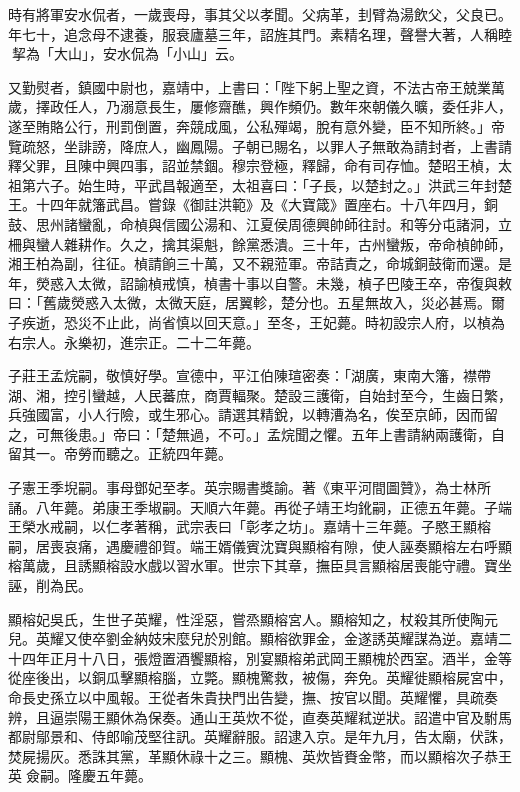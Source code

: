 時有將軍安水侃者，一歲喪母，事其父以孝聞。父病革，刲臂為湯飲父，父良已。年七十，追念母不逮養，服衰廬墓三年，詔旌其門。素精名理，聲譽大著，人稱睦挈為「大山」，安水侃為「小山」云。

又勤熨者，鎮國中尉也，嘉靖中，上書曰：「陛下躬上聖之資，不法古帝王兢業萬歲，擇政任人，乃溺意長生，屢修齋醮，興作頻仍。數年來朝儀久曠，委任非人，遂至賄賂公行，刑罰倒置，奔競成風，公私殫竭，脫有意外變，臣不知所終。」帝覽疏怒，坐誹謗，降庶人，幽鳳陽。子朝已賜名，以罪人子無敢為請封者，上書請釋父罪，且陳中興四事，詔並禁錮。穆宗登極，釋歸，命有司存恤。楚昭王楨，太祖第六子。始生時，平武昌報適至，太祖喜曰：「子長，以楚封之。」洪武三年封楚王。十四年就籓武昌。嘗錄《御註洪範》及《大寶箴》置座右。十八年四月，銅鼓、思州諸蠻亂，命楨與信國公湯和、江夏侯周德興帥師往討。和等分屯諸洞，立柵與蠻人雜耕作。久之，擒其渠魁，餘黨悉潰。三十年，古州蠻叛，帝命楨帥師，湘王柏為副，往征。楨請餉三十萬，又不親蒞軍。帝詰責之，命城銅鼓衛而還。是年，熒惑入太微，詔諭楨戒慎，楨書十事以自警。未幾，楨子巴陵王卒，帝復與敕曰：「舊歲熒惑入太微，太微天庭，居翼軫，楚分也。五星無故入，災必甚焉。爾子疾逝，恐災不止此，尚省慎以回天意。」至冬，王妃薨。時初設宗人府，以楨為右宗人。永樂初，進宗正。二十二年薨。

子莊王孟烷嗣，敬慎好學。宣德中，平江伯陳瑄密奏：「湖廣，東南大籓，襟帶湖、湘，控引蠻越，人民蕃庶，商賈輻聚。楚設三護衛，自始封至今，生齒日繁，兵強國富，小人行險，或生邪心。請選其精銳，以轉漕為名，俟至京師，因而留之，可無後患。」帝曰：「楚無過，不可。」孟烷聞之懼。五年上書請納兩護衛，自留其一。帝勞而聽之。正統四年薨。

子憲王季堄嗣。事母鄧妃至孝。英宗賜書獎諭。著《東平河間圖贊》，為士林所誦。八年薨。弟康王季埱嗣。天順六年薨。再從子靖王均鈋嗣，正德五年薨。子端王榮水戒嗣，以仁孝著稱，武宗表曰「彰孝之坊」。嘉靖十三年薨。子愍王顯榕嗣，居喪哀痛，遇慶禮卻賀。端王婿儀賓沈寶與顯榕有隙，使人誣奏顯榕左右呼顯榕萬歲，且誘顯榕設水戲以習水軍。世宗下其章，撫臣具言顯榕居喪能守禮。寶坐誣，削為民。

顯榕妃吳氏，生世子英耀，性淫惡，嘗烝顯榕宮人。顯榕知之，杖殺其所使陶元兒。英耀又使卒劉金納妓宋麼兒於別館。顯榕欲罪金，金遂誘英耀謀為逆。嘉靖二十四年正月十八日，張燈置酒饗顯榕，別宴顯榕弟武岡王顯槐於西室。酒半，金等從座後出，以銅瓜擊顯榕腦，立斃。顯槐驚救，被傷，奔免。英耀徙顯榕屍宮中，命長史孫立以中風報。王從者朱貴抉門出告變，撫、按官以聞。英耀懼，具疏奏辨，且逼崇陽王顯休為保奏。通山王英炊不從，直奏英耀弒逆狀。詔遣中官及駙馬都尉鄔景和、侍郎喻茂堅往訊。英耀辭服。詔逮入京。是年九月，告太廟，伏誅，焚屍揚灰。悉誅其黨，革顯休祿十之三。顯槐、英炊皆賚金幣，而以顯榕次子恭王英僉嗣。隆慶五年薨。

